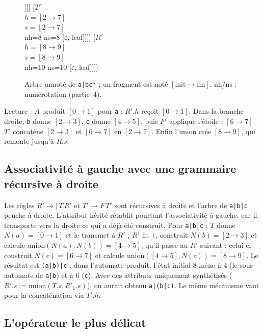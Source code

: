 \documentclass[12pt,a4paper]{article}
\newcommand{\code}[1]{{\fontsize{10}{12}\selectfont\texttt{#1}}}
\newcommand{\eps}{\ensuremath{\varepsilon}}
\newcommand{\fr}[2]{\ensuremath{[#1\to#2]}}
\newcommand{\tok}[1]{\ensuremath{\text{\fontsize{10}{12}\selectfont\ttfamily #1}}}
\begin{document}
\begin{figure}[H]
\begin{forest}
              [*, leaf]
              [{$F'$\\ $h{=}\fr{6}{7}$\\ $s{=}\fr{6}{7}$\\ nh=8 ns=8} [\eps, leaf]]]]
          [{$T'$\\ $h{=}\fr{2}{7}$\\ $s{=}\fr{2}{7}$\\ nh=8 ns=8} [\eps, leaf]]]]
      [{$R'$\\ $h{=}\fr{8}{9}$\\ $s{=}\fr{8}{9}$\\ nh=10 ns=10} [\eps, leaf]]]]
\end{forest}
\caption{Arbre annoté de \code{a|bc*} ; un fragment est noté $[\mathrm{init}\to\mathrm{fin}]$. nh/ns : numérotation (partie~4).}
\label{fig:arbre}
\end{figure}

Lecture : $A$ produit \fr01 pour \code{a} ; $R'.h$ reçoit \fr01. Dans la branche droite,
\code{b} donne \fr23, \code{c} donne \fr45, puis $F'$ applique l'étoile : \fr67. $T'$ concatène
\fr23 et \fr67 en \fr27. Enfin l'union crée \fr89, qui remonte jusqu'à $R.s$.

\subsection{Associativité à gauche avec une grammaire récursive à droite}

Les règles $R' \to \texttt{|}\,T\,R'$ et $T' \to F\,T'$ sont récursives à droite et l'arbre de
\code{a|b|c} penche à droite. L'attribut hérité rétablit pourtant l'associativité à gauche, car
il transporte vers la droite ce qui a déjà été construit. Pour \code{a|b|c} : $T$ donne
$N(a) = \fr01$ et le transmet à $R'$ ; $R'$ lit \tok{|}, construit $N(b) = \fr23$ et calcule
$\mathrm{union}(N(a), N(b)) = \fr45$, qu'il passe au $R'$ suivant ; celui-ci construit
$N(c) = \fr67$ et calcule $\mathrm{union}(\fr45, N(c)) = \fr89$. Le résultat est
\code{(a|b)|c} : dans l'automate produit, l'état initial 8 mène à 4 (le sous-automate de
\code{a|b}) et à 6 (\code{c}). Avec des attributs uniquement synthétisés
($R'.s := \mathrm{union}(T.s, R'_1.s)$), on aurait obtenu \code{a|(b|c)}. Le même mécanisme
vaut pour la concaténation via $T'.h$.

\subsection{L'opérateur le plus délicat}
\end{document}
